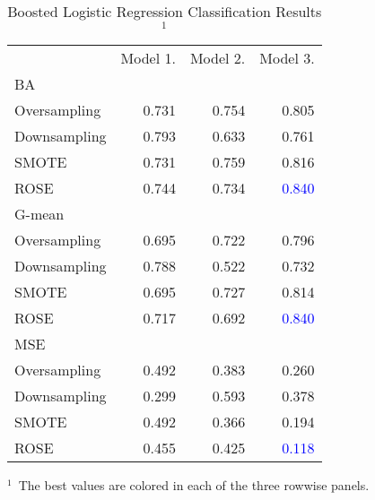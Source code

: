 \documentclass[5p, twocolumn, numbers, sort]{elsarticle}
\newcommand{\e}[1]{\textcolor{blue}{#1}}
\begin{document}
\begin{table}[th!b]
\centering
\caption{Boosted Logistic Regression Classification Results$^1$}
\label{tab: classification logistic regression}
\begin{threeparttable}
\begin{tabularx}{\linewidth}{lrrr}
\toprule
& Model 1. & Model 2. & Model 3. \\
\cmidrule{2-4}
BA \\
\cmidrule{1-1}
Oversampling & 0.731 & 0.754 & 0.805 \\
Downsampling & 0.793 & 0.633 & 0.761 \\
SMOTE & 0.731 & 0.759 & 0.816 \\
ROSE & 0.744 & 0.734 & \e{0.840} \\
\cmidrule{2-4}
G-mean \\
\cmidrule{1-1}
Oversampling & 0.695 & 0.722 & 0.796 \\
Downsampling & 0.788 & 0.522 & 0.732 \\
SMOTE & 0.695 & 0.727 & 0.814 \\
ROSE & 0.717 & 0.692 & \e{0.840} \\
\cmidrule{2-4}
MSE & \\
\cmidrule{1-1}
Oversampling & 0.492 & 0.383 & 0.260 \\
Downsampling & 0.299 & 0.593 & 0.378 \\
SMOTE & 0.492 & 0.366 & 0.194 \\
ROSE & 0.455 & 0.425 & \e{0.118} \\
\bottomrule
\end{tabularx}
\begin{tablenotes}
\begin{scriptsize}
\item{$^1$~The best values are colored in each of the three rowwise panels.}
\end{scriptsize}
\end{tablenotes}
\end{threeparttable}
\end{table}
\end{document}
